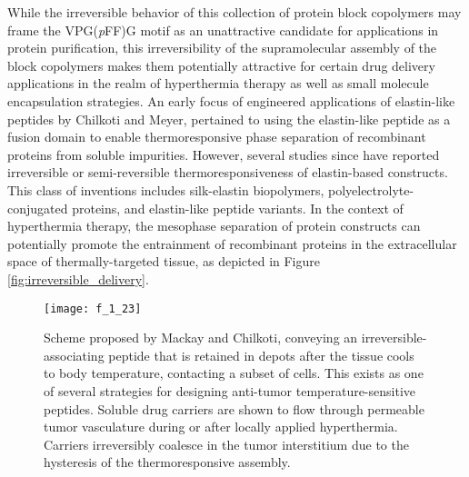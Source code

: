\begin{refsection}
While the irreversible behavior of this collection of protein block copolymers
may frame the VPG(\emph{p}FF)G motif as an unattractive candidate for
applications in protein purification, this irreversibility of the supramolecular
assembly of the block copolymers makes them potentially attractive for certain drug delivery
applications in the realm of hyperthermia therapy as well as small molecule
encapsulation strategies. An early focus of engineered applications of 
elastin-like peptides by Chilkoti and Meyer, pertained to 
using the elastin-like peptide as a fusion domain to enable thermoresponsive
phase separation of recombinant proteins from soluble
impurities.\cite{Meyer1999,Meyer2001} However, several studies since have reported
irreversible or semi-reversible thermoresponsiveness of elastin-based
constructs. This class of inventions includes silk-elastin biopolymers,
polyelectrolyte-conjugated proteins, and elastin-like peptide
variants.\cite{Herrero-Vanrell2005,Megeed2002,Kayitmazer2007} In the context of
hyperthermia therapy, the mesophase separation of protein constructs can
potentially promote the entrainment of recombinant proteins in the extracellular
space of thermally-targeted tissue, as depicted in Figure
\ref{fig:irreversible_delivery}.
\begin{figure}[h!] \centering \texttt{[image: f\_1\_23]}
    \caption[Scheme proposed by Mackay and Chilkoti, conveying an
        irreversible-associating peptide that is retained in depots after the
        tissue cools to body temperature, contacting a subset of cells. This
        exists as one of several strategies for designing anti-tumor
        temperature-sensitive peptides. Soluble drug carriers are shown to flow
        through permeable tumor vasculature during or after locally applied
        hyperthermia. Carriers irreversibly coalesce in the tumor interstitium
        due to the hysteresis of the thermoresponsive assembly.]

{Scheme proposed by Mackay and Chilkoti,\cite{Mackay2008} conveying an
irreversible-associating peptide that is retained in depots after the tissue
cools to body temperature, contacting a subset of cells. This exists as one of
several strategies for designing anti-tumor temperature-sensitive peptides.
Soluble drug carriers are shown to flow through permeable tumor vasculature
during or after locally applied hyperthermia. Carriers irreversibly coalesce in
the tumor interstitium due to the hysteresis of the thermoresponsive assembly.}


\end{figure}
\end{refsection}
